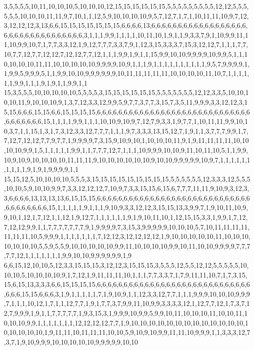 3,5,5,5,5,10,11,10,10,10,5,10,10,10,12,15,15,15,15,15,15,5,5,5,5,5,5,5,5,5,12,12,5,5,5,5,5,5,10,10,10,11,11,9,7,10,1,1,12,5,9,10,10,10,10,9,5,7,12,7,1,7,1,10,11,11,10,9,7,12,3,12,12,12,3,13,6,6,15,15,15,15,15,15,15,6,6,6,6,13,6,6,6,6,6,6,6,6,6,6,6,6,6,6,6,6,6,6,6,6,6,6,6,6,6,6,6,6,6,6,6,6,6,3,1,1,1,9,9,1,1,1,1,10,11,10,1,9,1,1,9,3,3,7,9,1,10,9,9,11,11,10,9,9,10,7,1,7,7,3,3,12,1,9,12,7,7,7,3,3,7,9,1,12,3,15,3,3,3,7,15,3,12,12,7,1,1,1,7,7,10,7,7,12,7,7,12,12,7,12,12,7,7,12,1,1,1,9,9,1,9,1,1,15,9,9,10,10,9,9,9,9,10,9,9,5,1,1,10,10,10,10,11,11,10,10,10,10,10,9,9,9,9,10,9,1,1,1,9,1,1,1,1,1,1,1,1,1,1,9,5,7,9,9,9,9,1,1,9,9,5,9,9,9,5,1,1,9,9,10,10,9,9,9,9,9,9,10,11,11,11,11,11,10,10,10,10,11,10,7,1,1,1,1,1,1,9,9,1,1,1,9,1,9,1,1,9,9,1,1
15,3,5,5,5,10,10,10,10,10,5,5,5,5,3,15,15,15,15,15,15,5,5,5,5,5,5,5,12,12,3,3,5,10,10,10,10,11,9,10,10,10,9,1,3,7,12,3,3,12,9,9,5,9,7,7,3,7,7,3,15,7,3,5,11,9,9,9,3,3,12,12,3,15,15,6,6,6,15,15,6,6,15,15,15,15,6,6,6,6,6,6,6,6,6,6,6,6,6,6,6,6,6,6,6,6,6,6,6,6,6,6,6,6,6,6,6,6,6,6,6,6,15,1,1,1,1,9,9,1,1,1,10,10,9,10,9,7,12,7,9,3,3,1,9,7,7,1,10,11,11,9,9,10,10,3,7,1,1,15,1,3,1,7,3,12,3,3,12,7,7,7,1,1,1,9,7,3,3,3,13,15,12,7,1,9,1,1,3,7,7,7,9,9,1,7,7,12,7,12,12,7,7,9,7,7,1,9,9,9,9,7,3,15,9,10,9,10,1,10,10,10,11,9,1,9,11,11,11,11,10,10,10,10,9,9,1,5,1,1,1,1,1,9,9,1,1,7,7,7,12,7,1,1,1,10,9,9,9,10,10,9,11,10,11,10,5,1,1,9,9,10,9,10,9,10,10,10,10,11,11,11,9,10,10,10,10,10,10,9,10,10,9,9,9,9,9,10,9,7,1,1,1,1,1,1,1,1,1,1,9,1,9,1,9,9,9,9,1,1
15,15,12,5,10,10,10,10,5,5,5,3,15,15,15,15,15,15,15,15,15,5,5,5,5,5,5,12,3,3,3,12,5,5,5,10,10,5,9,10,10,9,9,7,3,3,12,12,12,7,10,9,7,3,3,15,15,6,15,6,7,7,7,11,11,9,10,9,3,12,3,3,6,6,6,6,13,13,13,13,6,15,15,15,6,6,6,6,6,6,6,6,6,6,6,6,6,6,6,6,6,6,6,6,6,6,6,6,6,6,6,6,6,6,6,6,6,6,6,6,6,15,1,1,1,1,1,9,1,1,1,9,10,9,3,3,12,12,3,15,15,13,3,9,9,7,1,9,10,11,10,9,9,10,1,12,1,7,12,1,1,12,1,9,12,7,1,1,1,1,1,1,9,1,9,10,11,10,1,12,15,15,3,3,1,9,9,1,7,12,7,12,12,9,9,1,1,7,7,7,7,7,7,7,9,1,9,9,9,9,7,3,15,3,9,9,9,9,9,10,10,10,5,7,10,11,11,11,11,11,11,11,10,5,9,9,9,1,1,1,1,1,1,1,7,12,12,3,12,12,12,12,1,9,10,10,10,10,10,11,10,10,10,10,10,10,10,5,5,9,5,5,9,10,10,10,10,10,9,9,11,10,10,10,10,9,9,10,11,10,10,9,9,9,9,7,7,7,7,7,12,1,1,1,1,1,1,1,9,9,10,10,9,9,9,9,9,9,1,9
6,6,15,12,10,10,5,12,3,3,15,15,15,3,12,12,3,15,15,15,3,5,5,5,12,5,5,12,12,5,5,5,5,5,10,10,10,5,10,10,10,10,9,1,7,12,1,9,11,11,11,10,1,1,1,7,7,3,3,7,1,7,9,11,11,10,7,1,7,3,15,15,6,15,13,3,3,3,6,6,15,15,15,15,6,6,6,6,6,6,6,6,6,6,6,6,6,6,6,6,6,6,6,6,6,6,6,6,6,6,6,6,6,6,6,6,15,15,6,6,6,3,1,9,1,1,1,1,1,7,1,9,10,9,1,1,12,3,3,12,7,7,1,1,1,9,9,9,10,10,10,9,9,9,7,1,1,1,10,12,1,7,1,1,12,7,7,1,9,1,7,7,3,7,9,9,11,10,9,9,3,3,3,3,12,1,12,7,7,12,1,7,3,7,12,7,9,9,9,1,9,1,1,7,7,7,7,7,1,9,3,15,3,1,9,9,9,10,9,9,5,9,9,10,11,10,10,10,11,10,10,11,10,10,10,9,9,1,1,1,1,1,1,1,12,12,12,12,7,7,1,9,10,10,10,10,10,10,10,10,10,10,10,10,10,10,10,10,10,10,1,9,11,11,10,11,11,11,10,10,5,9,10,9,10,9,9,11,11,10,9,9,9,1,1,3,3,3,12,7,3,7,1,9,10,9,9,9,10,10,10,10,10,9,9,9,9,9,10,10
